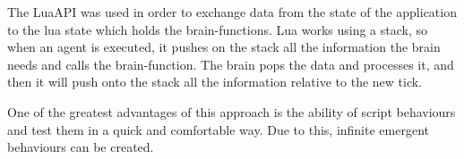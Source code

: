 The LuaAPI was used in order to exchange data from the state of the application to the lua state which holds the brain-functions. Lua works using a stack, so when an agent is executed, it pushes on the stack all the information the brain needs and calls the brain-function. The brain pops the data and processes it, and then it will push onto the stack all the information relative to the new tick. \citep{lua}

One of the greatest advantages of this approach is the ability of script behaviours and test them in a quick and comfortable way. Due to this, infinite emergent behaviours can be created.

\ifx\isEmbedded\undefined


\pagebreak

\fi